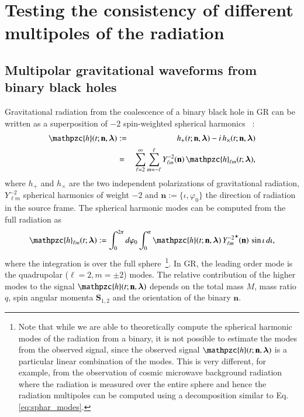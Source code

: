 \documentclass[prd,preprintnumbers,twocolumn,eqsecnum,floatfix,a4paper,nofootinbib,superscriptaddress]{revtex4}
\newcommand{\h}{\mathpzc{h}}
\newcommand{\hlm}{\mathpzc{h}_{\ell m}}
\newcommand{\Ylm}{{Y}^{-2}_{\ell m}}
\newcommand{\blambda}{\bm{\lambda}}
\newcommand{\n}{\mathbf{n}}
\begin{document}
\section{Testing the consistency of different multipoles of the radiation}
\label{sec:test}

\subsection{Multipolar gravitational waveforms from binary black holes}

Gravitational radiation from the coalescence of a binary black hole in GR can be written as a superposition of $-2$ spin-weighted spherical harmonics ~\cite{NewmanPenrose}:
\begin{eqnarray}
\h(t; \n, \blambda) &:=& h_+(t; \n, \blambda) - i \, h_\times(t; \n, \blambda) \\
&=& \sum _{\ell=2}^{\infty} \sum _{m=-\ell}^{\ell} {\Ylm} (\n) \, {{\hlm}(t; {\blambda})}, 
\label{eq:spherical_harmonics}
\end{eqnarray}
where $h_+$ and $h_{\times}$ are the two independent polarizations of gravitational radiation, ${\Ylm}$ spherical harmonics of weight $-2$ and $\n := \{\iota, \varphi_0\}$ the direction of radiation in the source frame. The spherical harmonic modes can be computed from the full radiation as 
\begin{equation}
\hlm(t; {\blambda}) := \int_0^{2\pi}  d\varphi_0 \int_0^{\pi} \h(t; \n, \blambda) \, {\Ylm}^\star (\n) \, \sin \iota \, d\iota, 
\label{eq:sphar_modes}
\end{equation}
where the integration is over the full sphere~\footnote{Note that while we are able to theoretically compute the spherical harmonic modes of the radiation from a binary, it is not possible to estimate the modes from the observed signal, since the observed signal $\h(t; \n, \blambda) $ is a particular linear combination of the modes. This is very different, for example, from the observation of cosmic microwave background radiation where the radiation is measured over the entire sphere and hence the radiation multipoles can be computed using a decomposition similar to Eq.\eqref{eq:sphar_modes}.}. In GR, the leading order mode is the quadrupolar ($\ell = 2, m = \pm 2$) modes. The relative contribution of the higher modes to the signal $\h(t; \n, \blambda)$ depends on the total mass $M$, mass ratio $q$, spin angular momenta ${\mathbf S}_{1,2}$ and the orientation of the binary $\n$. 
\end{document}
